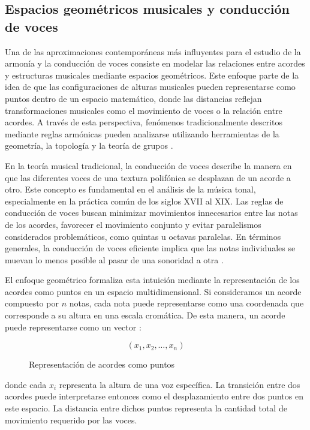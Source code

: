 \documentclass[12pt]{report}
\begin{document}
\subsection{Espacios geométricos musicales y conducción de voces}
Una de las aproximaciones contemporáneas más influyentes para el estudio de la armonía y la conducción de voces consiste en modelar las relaciones entre acordes y estructuras musicales mediante espacios geométricos. Este enfoque parte de la idea de que las configuraciones de alturas musicales pueden representarse como puntos dentro de un espacio matemático, donde las distancias reflejan transformaciones musicales como el movimiento de voces o la relación entre acordes. A través de esta perspectiva, fenómenos tradicionalmente descritos mediante reglas armónicas pueden analizarse utilizando herramientas de la geometría, la topología y la teoría de grupos \cite{roeder1984geometric}.

En la teoría musical tradicional, la conducción de voces describe la manera en que las diferentes voces de una textura polifónica se desplazan de un acorde a otro. Este concepto es fundamental en el análisis de la música tonal, especialmente en la práctica común de los siglos XVII al XIX. Las reglas de conducción de voces buscan minimizar movimientos innecesarios entre las notas de los acordes, favorecer el movimiento conjunto y evitar paralelismos considerados problemáticos, como quintas u octavas paralelas. En términos generales, la conducción de voces eficiente implica que las notas individuales se muevan lo menos posible al pasar de una sonoridad a otra \cite{tymoczko2006geometry7274}.

El enfoque geométrico formaliza esta intuición mediante la representación de los acordes como puntos en un espacio multidimensional. Si consideramos un acorde compuesto por $n$ notas, cada nota puede representarse como una coordenada que corresponde a su altura en una escala cromática. De esta manera, un acorde puede representarse como un vector \cite{callender2008generalized}:

\begin{figure}[h]
\centering
\[
(x_1, x_2, \dots, x_n)
\]
\caption{Representación de acordes como puntos}
\end{figure}


donde cada $x_i$ representa la altura de una voz específica. La transición entre dos acordes puede interpretarse entonces como el desplazamiento entre dos puntos en este espacio. La distancia entre dichos puntos representa la cantidad total de movimiento requerido por las voces.
\end{document}
